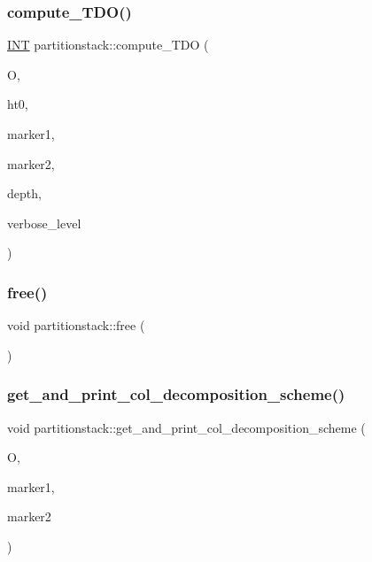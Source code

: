 \subsubsection{\texorpdfstring{compute\+\_\+\+T\+D\+O()}{compute\_TDO()}}
{\footnotesize\ttfamily \mbox{\hyperlink{galois_8h_a09fddde158a3a20bd2dcadb609de11dc}{I\+NT}} partitionstack\+::compute\+\_\+\+T\+DO (\begin{DoxyParamCaption}\item[{\mbox{\hyperlink{classorthogonal}{orthogonal}} \&}]{O,  }\item[{\mbox{\hyperlink{galois_8h_a09fddde158a3a20bd2dcadb609de11dc}{I\+NT}}}]{ht0,  }\item[{\mbox{\hyperlink{galois_8h_a09fddde158a3a20bd2dcadb609de11dc}{I\+NT}}}]{marker1,  }\item[{\mbox{\hyperlink{galois_8h_a09fddde158a3a20bd2dcadb609de11dc}{I\+NT}}}]{marker2,  }\item[{\mbox{\hyperlink{galois_8h_a09fddde158a3a20bd2dcadb609de11dc}{I\+NT}}}]{depth,  }\item[{\mbox{\hyperlink{galois_8h_a09fddde158a3a20bd2dcadb609de11dc}{I\+NT}}}]{verbose\+\_\+level }\end{DoxyParamCaption})}

\mbox{\label{classpartitionstack_a2700537302e50c65b9db6bbd4fd45f37}} 
\subsubsection{\texorpdfstring{free()}{free()}}
{\footnotesize\ttfamily void partitionstack\+::free (\begin{DoxyParamCaption}{ }\end{DoxyParamCaption})}

\mbox{\label{classpartitionstack_aab0912fcdea4cdcc60f3060c23b0f91b}} 
\subsubsection{\texorpdfstring{get\+\_\+and\+\_\+print\+\_\+col\+\_\+decomposition\+\_\+scheme()}{get\_and\_print\_col\_decomposition\_scheme()}}
{\footnotesize\ttfamily void partitionstack\+::get\+\_\+and\+\_\+print\+\_\+col\+\_\+decomposition\+\_\+scheme (\begin{DoxyParamCaption}\item[{\mbox{\hyperlink{classorthogonal}{orthogonal}} \&}]{O,  }\item[{\mbox{\hyperlink{galois_8h_a09fddde158a3a20bd2dcadb609de11dc}{I\+NT}}}]{marker1,  }\item[{\mbox{\hyperlink{galois_8h_a09fddde158a3a20bd2dcadb609de11dc}{I\+NT}}}]{marker2 }\end{DoxyParamCaption})}

